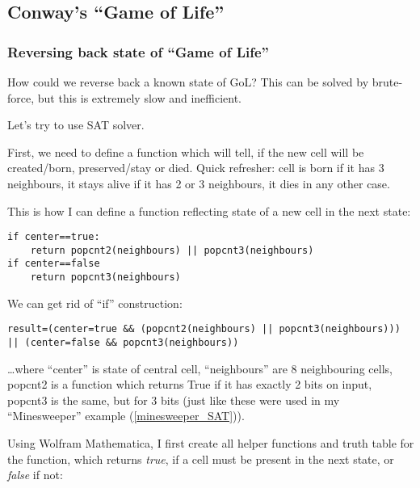 \subsection{Conway's ``Game of Life''}

\subsubsection{Reversing back state of ``Game of Life''}

How could we reverse back a known state of GoL?
This can be solved by brute-force, but this is extremely slow and inefficient.

Let's try to use SAT solver.

First, we need to define a function which will tell, if the new cell will be created/born, preserved/stay or died.
Quick refresher: cell is born if it has 3 neighbours, it stays alive if it has 2 or 3 neighbours, it dies in any other case.

This is how I can define a function reflecting state of a new cell in the next state:

\begin{lstlisting}
if center==true:
	return popcnt2(neighbours) || popcnt3(neighbours)
if center==false
	return popcnt3(neighbours)
\end{lstlisting}

We can get rid of ``if'' construction:

\begin{lstlisting}
result=(center=true && (popcnt2(neighbours) || popcnt3(neighbours))) || (center=false && popcnt3(neighbours))
\end{lstlisting}

\dots where ``center'' is state of central cell, ``neighbours'' are 8 neighbouring cells, popcnt2 is a function which
returns True if it has exactly 2 bits on input, popcnt3 is the same, but for 3 bits
(just like these were used in my ``Minesweeper'' example (\ref{minesweeper_SAT})).

Using Wolfram Mathematica, I first create all helper functions and truth table for the function, which returns \textit{true},
if a cell must be present in the next state, or \textit{false} if not:

